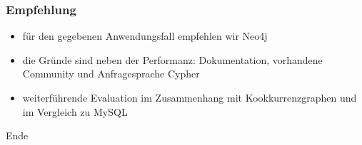 \documentclass{beamer}
\begin{document}
\begin{frame}\frametitle{Empfehlung}
	\begin{itemize}
		\item für den gegebenen Anwendungsfall empfehlen wir Neo4j
		\item die Gründe sind neben der Performanz: Dokumentation, vorhandene Community und Anfragesprache Cypher
		\item weiterführende Evaluation im Zusammenhang mit Kookkurrenzgraphen und im Vergleich zu MySQL
	\end{itemize} 
\end{frame}

\begin{frame}
	\begin{center}
		\begin{Huge}
			Ende
		\end{Huge}
	\end{center}
\end{frame}
\end{document}
